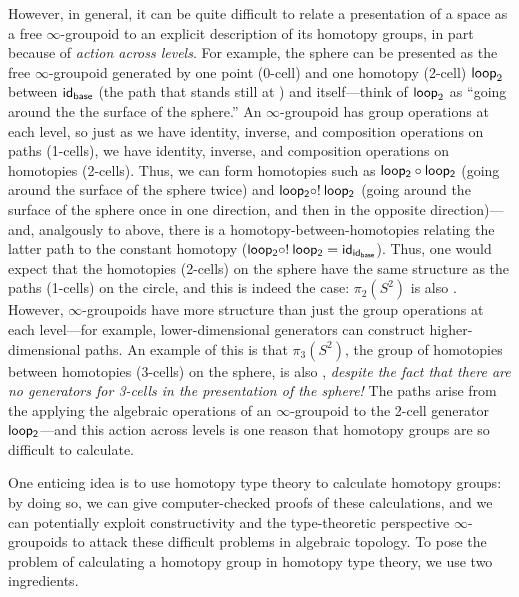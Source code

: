 However, in general, it can be quite difficult to relate a presentation
of a space as a free $\infty$-groupoid to an explicit description of its
homotopy groups, in part because of \emph{action across levels}.  For
example, the sphere can be presented as the free $\infty$-groupoid generated by
one point (0-cell)  and one homotopy (2-cell) $\mathsf{loop}_2$
between $\mathsf{id}_{{\mathsf{base}}}$ (the path that stands still at
) and itself---think of $\mathsf{loop}_2$ as ``going around the
the surface of the sphere.''  An $\infty$-groupoid has group operations
at each level, so just as we have identity, inverse, and composition
operations on paths (1-cells), we have identity, inverse, and
composition operations on homotopies (2-cells).  Thus, we can form
homotopies such as $\mathsf{loop_2} \mathbin{\circ} \mathsf{loop_2}$ (going around the
surface of the sphere twice) and $\mathsf{loop_2} \mathbin{\circ} ! \: \mathsf{loop_2}$
(going around the surface of the sphere once in one direction, and then
in the opposite direction)---and, analgously to above, there is a
homotopy-between-homotopies relating the latter path to the constant
homotopy ($\mathsf{loop_2} \mathbin{\circ} ! \: \mathsf{loop_2} =
\mathsf{id}_{{\mathsf{id}_{\mathsf{base}}}}$).  Thus, one would expect that the
homotopies (2-cells) on the sphere have the same structure as the paths
(1-cells) on the circle, and this is indeed the case: $\pi_2(S^2)$ is
also \Z.  However, $\infty$-groupoids have more structure than just the
group operations at each level---for example, lower-dimensional
generators can construct higher-dimensional paths.  An example of this
is that $\pi_3(S^2)$, the group of homotopies between homotopies
(3-cells) on the sphere, is also \Z, \emph{despite the fact that there
  are no generators for 3-cells in the presentation of the sphere!}  The
paths arise from the applying the algebraic operations of an
$\infty$-groupoid to the 2-cell generator $\mathsf{loop_2}$---and this
action across levels is one reason that homotopy groups are so difficult
to calculate.  

One enticing idea is to use homotopy type theory to calculate homotopy
groups: by doing so, we can give computer-checked proofs of these
calculations, and we can potentially exploit constructivity and the
type-theoretic perspective $\infty$-groupoids to attack these difficult
problems in algebraic topology.  To pose the problem of calculating a
homotopy group in homotopy type theory, we use two ingredients.  

